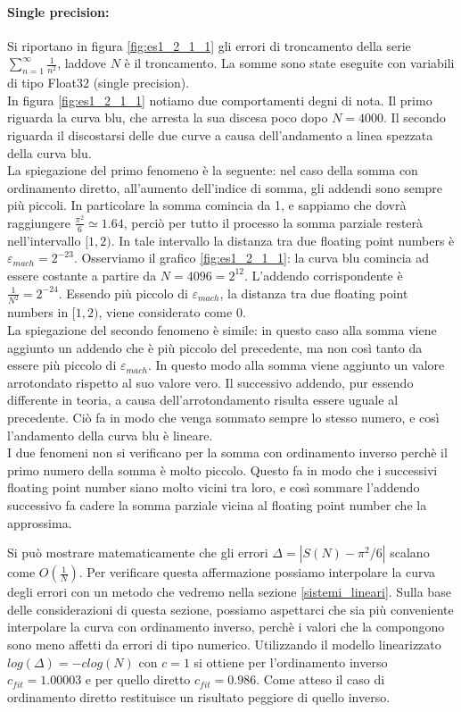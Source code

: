 \documentclass[letterpaper, 12pt]{article}
\numberwithin{equation}{section}    %
\begin{document}
\paragraph{Single precision:}Si riportano in figura \ref{fig:es1_2_1_1} gli errori di troncamento della serie 
$\sum_{n=1}^\infty \frac{1}{n^2}$, laddove $N$ è il troncamento. La somme sono state eseguite
con variabili di tipo Float32 (single precision). \\
In figura \ref{fig:es1_2_1_1} notiamo due comportamenti degni di nota. Il primo riguarda
la curva blu, che arresta la sua discesa poco dopo $N = 4000$. 
Il secondo riguarda il discostarsi delle due curve a causa dell'andamento a linea spezzata della curva blu.\\
La spiegazione del primo fenomeno è la seguente: nel caso della somma con ordinamento
diretto, all'aumento dell'indice di somma, gli addendi sono sempre più piccoli. In
particolare la somma comincia da 1, e sappiamo che dovrà raggiungere $\frac{\pi^2}{6} \simeq 1.64$, perciò 
per tutto il processo la somma parziale resterà nell'intervallo $[1, 2)$. In tale intervallo la distanza tra due 
floating point numbers è $\varepsilon_{mach} = 2^{-23}$. Osserviamo il grafico \ref{fig:es1_2_1_1}: la curva blu comincia ad essere 
costante a partire da $N = 4096 = 2^{12}$.  L'addendo corrispondente è $\frac{1}{N^2} = 2^{-24}$.
Essendo più piccolo di $\varepsilon_{mach}$, la distanza tra due floating point numbers in $[1, 2)$, 
viene considerato come $0$. \\
La spiegazione del secondo fenomeno è simile: in questo caso alla somma viene aggiunto
un addendo che è più piccolo del precedente, ma non così tanto da essere più piccolo di $\varepsilon_{mach}$. In
questo modo alla somma viene aggiunto un valore arrotondato rispetto al suo valore vero. Il successivo
addendo, pur essendo differente in teoria, a causa dell'arrotondamento risulta essere uguale al precedente. Ciò fa
in modo che venga sommato sempre lo stesso numero, e così l'andamento della curva blu è lineare. \\
I due fenomeni non si verificano per la somma con ordinamento inverso perchè il primo numero della somma
è molto piccolo. Questo fa in modo che i successivi floating point number siano molto vicini tra loro, e 
così sommare
l'addendo successivo fa cadere la somma parziale vicina al floating point number che la approssima. 

\vspace{0.5cm}

Si può mostrare matematicamente che gli errori $\Delta = |S(N)-\pi^2/6|$ scalano come $O(\frac{1}{N})$. Per verificare questa
affermazione possiamo interpolare la curva degli errori con un metodo che vedremo nella sezione \ref{sistemi_lineari}.
Sulla base delle considerazioni di questa sezione, possiamo aspettarci che sia più conveniente interpolare la curva 
con ordinamento inverso, perchè i valori che la compongono sono meno affetti da errori di tipo numerico. Utilizzando 
il modello linearizzato $log(\Delta) = -c log(N)$ con $c = 1$ si ottiene per l'ordinamento inverso 
$c_{fit} = 1.00003$ e per quello diretto $c_{fit} = 0.986$. Come atteso il caso di ordinamento diretto restituisce un
risultato peggiore di quello inverso.
\end{document}
